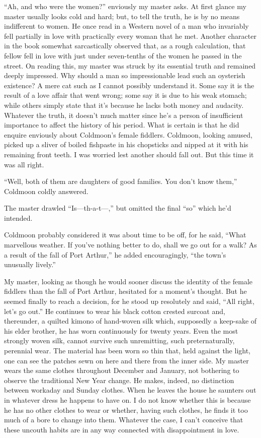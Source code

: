 \documentclass[12pt, openright]{book}
\begin{document}
``Ah, and who were the women?'' enviously my master asks. At first
glance my master usually looks cold and hard; but, to tell the truth, he
is by no means indifferent to women. He once read in a Western novel of
a man who invariably fell partially in love with practically every woman
that he met. Another character in the book somewhat sarcastically
observed that, as a rough calculation, that fellow fell in love with
just under seven-tenths of the women he passed in the street. On reading
this, my master was struck by its essential truth and remained deeply
impressed. Why should a man so impressionable lead such an oysterish
existence? A mere cat such as I cannot possibly understand it. Some say
it is the result of a love affair that went wrong; some say it is due to
his weak stomach; while others simply state that it's because he lacks
both money and audacity. Whatever the truth, it doesn't much matter
since he's a person of insufficient importance to affect the history of
his period. What is certain is that he did enquire enviously about
Coldmoon's female fiddlers. Coldmoon, looking amused, picked up a sliver
of boiled fishpaste in his chopsticks and nipped at it with his
remaining front teeth. I was worried lest another should fall out. But
this time it was all right.

``Well, both of them are daughters of good families. You don't know
them,'' Coldmoon coldly answered.

The master drawled ``Is---th-a-t---,'' but omitted the final ``so''
which he'd intended.

Coldmoon probably considered it was about time to be off, for he said,
``What marvellous weather. If you've nothing better to do, shall we go
out for a walk? As a result of the fall of Port Arthur,'' he added
encouragingly, ``the town's unusually lively.''

My master, looking as though he would sooner discuss the identity of the
female fiddlers than the fall of Port Arthur, hesitated for a moment's
thought. But he seemed finally to reach a decision, for he stood up
resolutely and said, ``All right, let's go out.'' He continues to wear
his black cotton crested surcoat and, thereunder, a quilted kimono of
hand-woven silk which, supposedly a keep-sake of his elder brother, he
has worn continuously for twenty years. Even the most strongly woven
silk, cannot survive such unremitting, such preternaturally, perennial
wear. The material has been worn so thin that, held against the light,
one can see the patches sewn on here and there from the inner side. My
master wears the same clothes throughout December and January, not
bothering to observe the traditional New Year change. He makes, indeed,
no distinction between workaday and Sunday clothes. When he leaves the
house he saunters out in whatever dress he happens to have on. I do not
know whether this is because he has no other clothes to wear or whether,
having such clothes, he finds it too much of a bore to change into them.
Whatever the case, I can't conceive that these uncouth habits are in any
way connected with disappointment in love.
\end{document}
